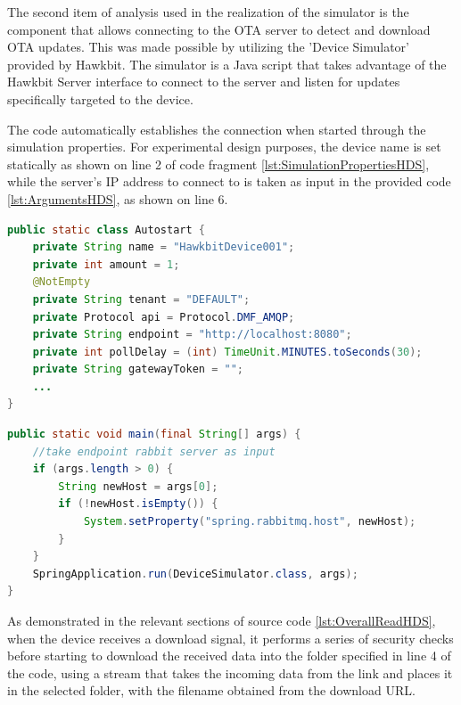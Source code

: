 The second item of analysis used in the realization of the simulator is the component that allows connecting to the OTA server to detect and download OTA updates. This was made possible by utilizing the 'Device Simulator' provided by Hawkbit. The simulator is a Java script that takes advantage of the Hawkbit Server interface to connect to the server and listen for updates specifically targeted to the device.

The code automatically establishes the connection when started through the simulation properties. For experimental design purposes, the device name is set statically as shown on line 2 of code fragment \ref{lst:SimulationPropertiesHDS}, while the server's IP address to connect to is taken as input in the provided code \ref{lst:ArgumentsHDS}, as shown on line 6.

\begin{lstlisting}[language=Java, caption={Simulation properties of the Hawkbit Device Simulator}, label=lst:SimulationPropertiesHDS]
public static class Autostart {
    private String name = "HawkbitDevice001";
    private int amount = 1;
    @NotEmpty
    private String tenant = "DEFAULT";
    private Protocol api = Protocol.DMF_AMQP;
    private String endpoint = "http://localhost:8080";
    private int pollDelay = (int) TimeUnit.MINUTES.toSeconds(30);
    private String gatewayToken = "";
    ...
}
\end{lstlisting}

\lstset{numbers=left}
\begin{lstlisting}[language=Java, caption={Input arguments to set the ip of the OTA server to contact}, label=lst:ArgumentsHDS]
public static void main(final String[] args) {
    //take endpoint rabbit server as input
    if (args.length > 0) {
        String newHost = args[0];
        if (!newHost.isEmpty()) {
            System.setProperty("spring.rabbitmq.host", newHost);
        }
    }
    SpringApplication.run(DeviceSimulator.class, args);
}
\end{lstlisting}

As demonstrated in the relevant sections of source code \ref{lst:OverallReadHDS}, when the device receives a download signal, it performs a series of security checks before starting to download the received data into the folder specified in line 4 of the code, using a stream that takes the incoming data from the link and places it in the selected folder, with the filename obtained from the download URL.


